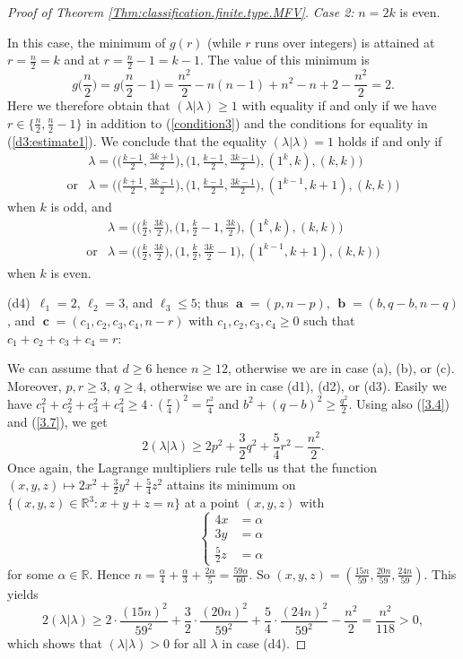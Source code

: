 \documentclass[12pt,reqno]{amsart}
\begin{document}
\begin{proof}[Proof  of Theorem \ref{Thm:classification.finite.type.MFV}]
\medskip
\noindent
{\it Case 2:} $n=2k$ is even.

In this case, the minimum of $g(r)$ (while $r$ runs over integers) is attained at $r=\frac{n}{2}=k$ and at $r=\frac{n}{2}-1=k-1$. The value of this minimum is
$$
g\Big(\frac{n}{2}\Big)=g\Big(\frac{n}{2}-1\Big)=\frac{n^2}{2}-n(n-1)+n^2-n+2-\frac{n^2}{2}=2.
$$
Here we therefore obtain that
$(\lambda|\lambda)\geq 1$ with equality if and only if we have $r\in\{\frac{n}{2},\frac{n}{2}-1\}$ in addition to (\ref{condition3}) and the conditions for equality in (\ref{d3:estimate1}).
We conclude that the equality $(\lambda|\lambda)=1$ holds if and only if
\begin{eqnarray*}
& \displaystyle \lambda=\Big(\Big(\frac{k-1}{2},\frac{3k+1}{2}\Big),\Big(1,\frac{k-1}{2},\frac{3k-1}{2}\Big),(1^k,k),(k,k)\Big) \\[2mm]
\mbox{or} & \displaystyle \lambda=\Big(\Big(\frac{k+1}{2},\frac{3k-1}{2}\Big),\Big(1,\frac{k-1}{2},\frac{3k-1}{2}\Big),(1^{k-1},k+1),(k,k)\Big)
\end{eqnarray*}
when $k$ is odd, and
\begin{eqnarray*}
& \displaystyle \lambda=\Big(\Big(\frac{k}{2},\frac{3k}{2}\Big),\Big(1,\frac{k}{2}-1,\frac{3k}{2}\Big),(1^k,k),(k,k)\Big) \\[2mm]
\mbox{or} & \displaystyle \lambda=\Big(\Big(\frac{k}{2},\frac{3k}{2}\Big),\Big(1,\frac{k}{2},\frac{3k}{2}-1\Big),(1^{k-1},k+1),(k,k)\Big)
\end{eqnarray*}
when $k$ is even.


\bigskip
\noindent
(d4)\  $\ell_1=2$, $\ell_2=3$, and $\ell_3\leq 5$; thus
$\mbfa=(p,n-p)$, $\mbfb=(b,q-b,n-q)$, and $\mbfc=(c_1,c_2,c_3,c_4,n-r)$
with $c_1,c_2,c_3,c_4\geq 0$ such that $c_1+c_2+c_3+c_4=r$:

We can assume that $d\geq 6$ hence $n\geq 12$, otherwise we are in case (a), (b), or (c). Moreover, $p,r\geq 3$, $q\geq 4$,
otherwise we are in case (d1), (d2), or (d3).
Easily we have
$c_1^2+c_2^2+c_3^2+c_4^2\geq 4\cdot(\frac{r}{4})^2=\frac{r^2}{4}$
and $b^2+(q-b)^2\geq\frac{q^2}{2}$. Using also (\ref{3.4}) and (\ref{3.7}), we get
$$
2(\lambda|\lambda)\geq 2p^2+\frac{3}{2}q^2+\frac{5}{4}r^2-\frac{n^2}{2}.
$$
Once again, the Lagrange multipliers rule tells us that the function $(x,y,z)\mapsto 2x^2+\frac{3}{2}y^2+\frac{5}{4}z^2$ attains its minimum on $\{(x,y,z)\in\mathbb{R}^3:x+y+z=n\}$ at a point $(x,y,z)$ with
$$
\left\{\begin{array}{ll}
4x & =\alpha \\ 3y & =\alpha \\ \frac{5}{2}z & = \alpha
\end{array}\right.
$$
for some $\alpha\in\mathbb{R}$.
Hence $n=\frac{\alpha}{4}+\frac{\alpha}{3}+\frac{2\alpha}{5}=\frac{59\alpha}{60}$. So $(x,y,z)=(\frac{15n}{59},\frac{20n}{59},\frac{24n}{59})$.
This yields
%
\begin{equation}\label{eq:ineq.for.n.Case:d4}
2(\lambda|\lambda)\geq 2\cdot\frac{(15n)^2}{59^2}+\frac{3}{2}\cdot\frac{(20n)^2}{59^2}+\frac{5}{4}\cdot\frac{(24n)^2}{59^2}-\frac{n^2}{2}=\frac{n^2}{118}>0,
\end{equation}
which shows that $(\lambda|\lambda)>0$ for all $\lambda$ in case (d4).


\end{proof}
\end{document}
